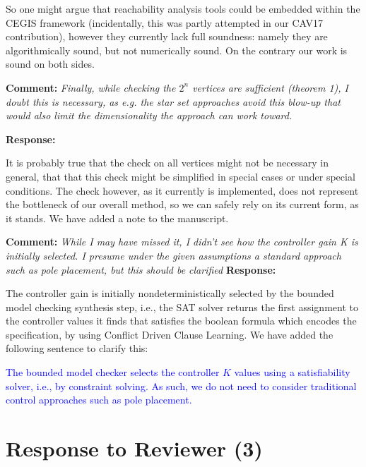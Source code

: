 \documentclass{article}
\newcommand{\rev}[1]{\textcolor{blue}{#1}}
\begin{document}
So one might argue that reachability analysis tools could be embedded within the CEGIS framework (incidentally, this was partly attempted in our CAV17 contribution), 
however they currently lack full soundness: namely they 
are algorithmically sound, but not numerically sound. On the contrary our work is sound on both sides. 


\vspace{2em}
{\bf Comment: }
{\itshape Finally, while checking the $2^n$ vertices
are sufficient (theorem 1), I doubt this is necessary, as e.g. the star set approaches avoid this blow-up that would also limit the dimensionality
the approach can work toward.}
\vspace{1em}

{\bf Response: }

It is probably true that the check on all vertices might not be necessary in general, that that this check might be simplified in special cases
or under special conditions. The check however, as it currently is implemented, does not represent the bottleneck of our overall method, so we can
safely rely on its current form, as it stands.   
We have added a note to the manuscript.

\vspace{2em}

{\bf Comment: }
{\itshape While I may have missed it, I didn't see how the controller gain K is initially selected. I presume under the given assumptions a standard
approach
such as pole placement, but this should be clarified}
\vspace{1em}
{\bf Response: }

The controller gain is initially nondeterministically selected by the bounded model checking synthesis step, i.e., the SAT solver returns the first
assignment to the controller
values it finds
that satisfies the boolean formula which encodes the specification, by using Conflict Driven Clause Learning.
We have added the following sentence to clarify this:

\rev{The bounded model checker selects the controller $K$ values using a satisfiability solver, i.e.,
by constraint solving. As such, we do not need to consider traditional control approaches such as pole placement.}

\vspace{2em}

\section{Response to Reviewer (3)}
\end{document}
